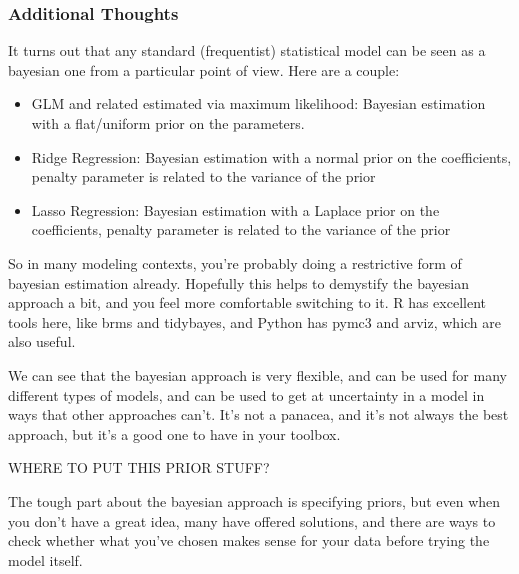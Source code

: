 \documentclass[
  letterpaper,
]{krantz}
\providecommand{\tightlist}{%
  \setlength{\itemsep}{0pt}\setlength{\parskip}{0pt}}\usepackage{longtable,booktabs,array}
\begin{document}
\subsubsection{Additional Thoughts}\label{additional-thoughts}

It turns out that any standard (frequentist) statistical model can be
seen as a bayesian one from a particular point of view. Here are a
couple:

\begin{itemize}
\tightlist
\item
  GLM and related estimated via maximum likelihood: Bayesian estimation
  with a flat/uniform prior on the parameters.
\item
  Ridge Regression: Bayesian estimation with a normal prior on the
  coefficients, penalty parameter is related to the variance of the
  prior
\item
  Lasso Regression: Bayesian estimation with a Laplace prior on the
  coefficients, penalty parameter is related to the variance of the
  prior
\end{itemize}

So in many modeling contexts, you're probably doing a restrictive form
of bayesian estimation already. Hopefully this helps to demystify the
bayesian approach a bit, and you feel more comfortable switching to it.
R has excellent tools here, like brms and tidybayes, and Python has
pymc3 and arviz, which are also useful.

We can see that the bayesian approach is very flexible, and can be used
for many different types of models, and can be used to get at
uncertainty in a model in ways that other approaches can't. It's not a
panacea, and it's not always the best approach, but it's a good one to
have in your toolbox.

WHERE TO PUT THIS PRIOR STUFF?

The tough part about the bayesian approach is specifying priors, but
even when you don't have a great idea, many have offered solutions, and
there are ways to check whether what you've chosen makes sense for your
data before trying the model itself.
\end{document}

